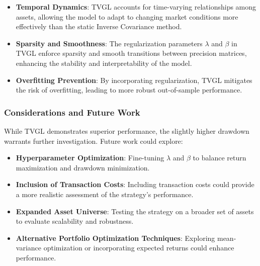 \documentclass{article}
\begin{document}
\begin{itemize}
    \item \textbf{Temporal Dynamics}: TVGL accounts for time-varying relationships among assets, allowing the model to adapt to changing market conditions more effectively than the static Inverse Covariance method.
    \item \textbf{Sparsity and Smoothness}: The regularization parameters \(\lambda\) and \(\beta\) in TVGL enforce sparsity and smooth transitions between precision matrices, enhancing the stability and interpretability of the model.
    \item \textbf{Overfitting Prevention}: By incorporating regularization, TVGL mitigates the risk of overfitting, leading to more robust out-of-sample performance.
\end{itemize}

\subsubsection{Considerations and Future Work}

While TVGL demonstrates superior performance, the slightly higher drawdown warrants further investigation. Future work could explore:

\begin{itemize}
    \item \textbf{Hyperparameter Optimization}: Fine-tuning \(\lambda\) and \(\beta\) to balance return maximization and drawdown minimization.
    \item \textbf{Inclusion of Transaction Costs}: Including transaction costs could provide a more realistic assessment of the strategy's performance.
    \item \textbf{Expanded Asset Universe}: Testing the strategy on a broader set of assets to evaluate scalability and robustness.
    \item \textbf{Alternative Portfolio Optimization Techniques}: Exploring mean-variance optimization or incorporating expected returns could enhance performance.
\end{itemize}
\end{document}
